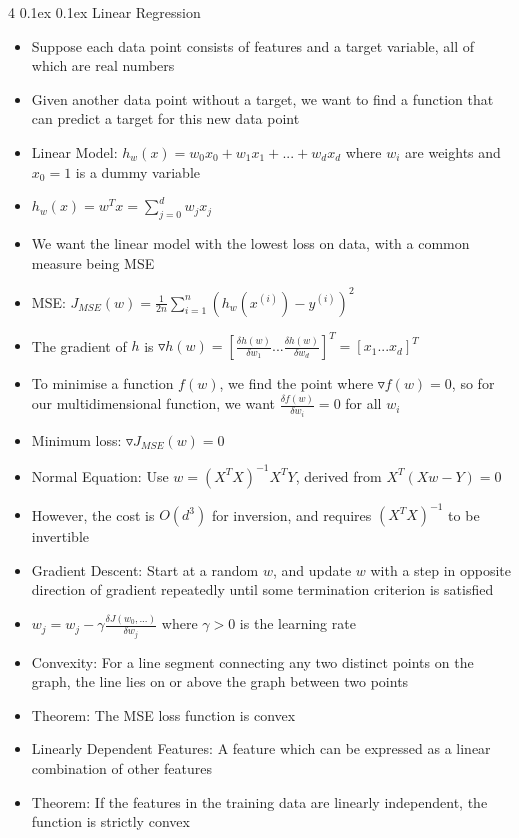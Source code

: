 \documentclass[10pt, landscape]{article}
\makeatletter
\renewcommand{\section}{\@startsection{section}{1}{0mm}%
  {0.1ex} %
  {0.1ex} %
  {\normalfont\large\bfseries}}
\makeatother
\begin{document}
\begin{multicols*}{4}
\section{Linear Regression}
\begin{itemize}
    \item Suppose each data point consists of features and a target variable, all of which are real numbers
    \item Given another data point without a target, we want to find a function that can predict a target for this new data point
    \item Linear Model: $h_w(x)=w_0x_0+w_1x_1+...+w_dx_d$ where $w_i$ are weights and $x_0=1$ is a dummy variable
    \item $h_w(x)=w^Tx=\sum_{j=0}^dw_jx_j$
    \item We want the linear model with the lowest loss on data, with a common measure being MSE
    \item MSE: $J_{MSE}(w)=\frac{1}{2n}\sum_{i=1}^n(h_w(x^{(i)})-y^{(i)})^2$
    \item The gradient of $h$ is $\triangledown h(w)=[\frac{\delta h(w)}{\delta w_1}...\frac{\delta h(w)}{\delta w_d}]^T=[x_1...x_d]^T$
    \item To minimise a function $f(w)$, we find the point where $\triangledown f(w) = 0$, so for our multidimensional function, we want $\frac{\delta f(w)}{\delta w_i}=0$ for all $w_i$
    \item Minimum loss: $\triangledown J_{MSE}(w)=0$
    \item Normal Equation: Use $w=(X^TX)^{-1}X^TY$, derived from $X^T(Xw-Y)=0$
    \item However, the cost is $O(d^3)$ for inversion, and requires $(X^TX)^{-1}$ to be invertible
    \item Gradient Descent: Start at a random $w$, and update $w$ with a step in opposite direction of gradient repeatedly until some termination criterion is satisfied
    \item $w_j=w_j-\gamma\frac{\delta J(w_0,...)}{\delta w_j}$ where $\gamma>0$ is the learning rate
    \item Convexity: For a line segment connecting any two distinct points on the graph, the line lies on or above the graph between two points
    \item Theorem: The MSE loss function is convex
    \item Linearly Dependent Features: A feature which can be expressed as a linear combination of other features
    \item Theorem: If the features in the training data are linearly independent, the function is strictly convex

\end{itemize}
\end{multicols*}
\end{document}
